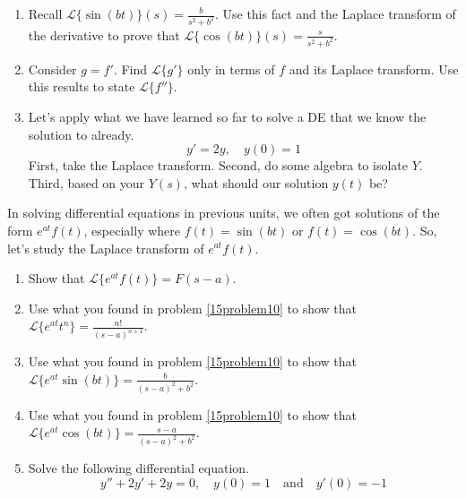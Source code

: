 \newpage
\begin{enumerate}[resume]
\item Recall $\mathscr{L}\{\sin(bt)\}(s)=\displaystyle\frac{b}{s^2+b^2}$. Use this fact and the Laplace transform of the derivative to prove that $\mathscr{L}\{\cos(bt)\}(s)=\displaystyle\frac{s}{s^2+b^2}$. \label{15problem7}
\vfill
\item Consider $g=f'$. Find $\mathscr{L}\{g'\}$ only in terms of $f$ and its Laplace transform. Use this results to state $\mathscr{L}\{f''\}$. \label{15problem8}
\vfill
\newpage

\item Let's apply what we have learned so far to solve a DE that we know the solution to already. \label{15problem9}
\[
y'=2y, \quad y(0)=1
\]
First, take the Laplace transform. Second, do some algebra to isolate $Y$. Third, based on your $Y(s)$, what should our solution $y(t)$ be?
\end{enumerate}
\vfill
In solving differential equations in previous units, we often got solutions of the form $e^{at}f(t)$, especially where $f(t)=\sin(bt)$ or $f(t)=\cos(bt)$. So, let's study the Laplace transform of $e^{at}f(t)$.
\begin{enumerate}[resume]
\item Show that $\mathscr{L}\{e^{at}f(t)\}=F(s-a)$. \label{15problem10}
\vfill
\item Use what you found in problem \ref{15problem10} to show that $\displaystyle\mathscr{L}\{e^{at}t^n\}=\frac{n!}{(s-a)^{n+1}}$. \label{15problem11}
\vfill
\newpage
\item Use what you found in problem \ref{15problem10} to show that $\displaystyle\mathscr{L}\{e^{at}\sin(bt)\}=\frac{b}{(s-a)^2+b^2}$. \label{15problem12}
\vfill
\item Use what you found in problem \ref{15problem10} to show that $\displaystyle\mathscr{L}\{e^{at}\cos(bt)\}=\frac{s-a}{(s-a)^2+b^2}$. \label{15problem13}
\vfill
\item Solve the following differential equation. \label{15problem14}
\[
y''+2y'+2y=0, \quad y(0)=1 \quad \text{and} \quad y'(0)=-1
\]
\vfill
\end{enumerate}

\newpage
{}


